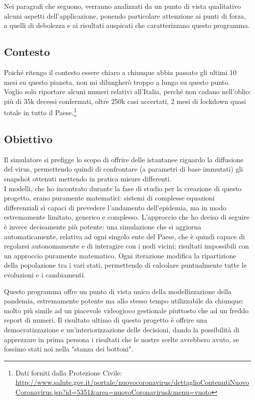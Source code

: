 \documentclass[a4paper, 12pt]{article}
\begin{document}
	Nei paragrafi che seguono, verranno analizzati da un punto di vista qualitativo alcuni aspetti dell'applicazione, ponendo particolare attenzione ai punti di forza, a quelli di debolezza e ai risultati auspicati che caratterizzano questo programma.
	
	\subsection{Contesto}
		Poiché ritengo il contesto essere chiaro a chiunque abbia passato gli ultimi 10 mesi su questo pianeta, non mi dilungherò troppo a lungo su questo punto.\\
		Voglio solo riportare alcuni numeri relativi all'Italia, perché non cadano nell'oblio: più di 35k decessi confermati, oltre 250k casi accertati, 2 mesi di lockdown quasi totale in tutto il Paese.\footnote{Dati forniti dalla Protezione Civile: \url{http://www.salute.gov.it/portale/nuovocoronavirus/dettaglioContenutiNuovoCoronavirus.jsp?id=5351&area=nuovoCoronavirus&menu=vuoto}}
	
	\subsection{Obiettivo}
		Il simulatore si prefigge lo scopo di offrire delle istantanee riguardo la diffusione del virus, permettendo quindi di confrontare (a parametri di base immutati) gli snapshot ottenuti mettendo in pratica misure differenti.\\
		I modelli, che ho incontrato durante la fase di studio per la creazione di questo progetto, erano puramente matematici: sistemi di complesse equazioni differenziali sì capaci di prevedere l'andamento dell'epidemia, ma in modo estremamente limitato, generico e complesso.
		L'approccio che ho deciso di seguire è invece decisamente più potente: una simulazione che si aggiorna automaticamente, relativa ad ogni singolo ente del Paese, che è quindi capace di regolarsi autonomamente e di interagire con i nodi  vicini; risultati impossibili con un approccio puramente matematico.
		Ogni iterazione modifica la ripartizione della popolazione tra i vari stati, permettendo di calcolare puntualmente tutte le evoluzioni e i cambiamenti.
		
		Questo programma offre un punto di vista unico della modellizzazione della pandemia, estremamente potente ma allo stesso tempo utilizzabile da chiunque: molto più simile ad un piacevole videogioco gestionale piuttosto che ad un freddo report di numeri.
		Il risultato ultimo di questo progetto è offrire una democratizzazione e un'interiorizzazione delle decisioni, dando la possibilità di apprezzare in prima persona i risultati che le nostre scelte avrebbero avuto, se fossimo stati noi nella "stanza dei bottoni".
		
\end{document}
